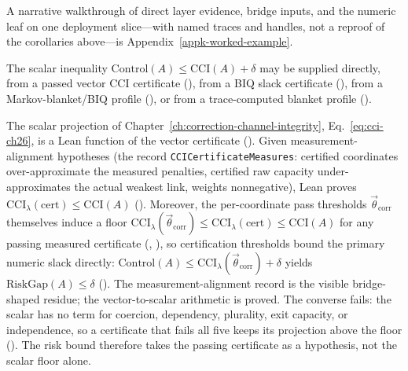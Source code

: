 A narrative walkthrough of direct layer evidence, bridge inputs, and the numeric leaf on one deployment slice---with named traces and handles, not a reproof of the corollaries above---is Appendix~\ref{appk-worked-example}.

\begin{corollary}
\label{appi:cor:numeric-risk-leaves}
The scalar inequality \(\mathrm{Control}(A)\leq \mathrm{CCI}(A)+\delta\) may be supplied directly, from a passed vector CCI certificate (), from a BIQ slack certificate (), from a Markov-blanket/BIQ profile (), or from a trace-computed blanket profile ().
\end{corollary}

\begin{lemma}
\label{appi:lem:cci-lambda-floor}
The scalar projection of Chapter~\ref{ch:correction-channel-integrity}, Eq.~\eqref{eq:cci-ch26}, is a Lean function of the vector certificate ().
Given measurement-alignment hypotheses (the record \texttt{CCICertificateMeasures}: certified coordinates over-approximate the measured penalties, certified raw capacity under-approximates the actual weakest link, weights nonnegative), Lean proves
\(\mathrm{CCI}_{\lambda}(\mathrm{cert}) \leq \mathrm{CCI}(A)\)
().
Moreover, the per-coordinate pass thresholds \(\vec{\theta}_{\mathrm{corr}}\) themselves induce a floor
\(\mathrm{CCI}_{\lambda}(\vec{\theta}_{\mathrm{corr}}) \leq \mathrm{CCI}_{\lambda}(\mathrm{cert}) \leq \mathrm{CCI}(A)\)
for any passing measured certificate (, ), so certification thresholds bound the primary numeric slack directly:
\(\mathrm{Control}(A)\leq \mathrm{CCI}_{\lambda}(\vec{\theta}_{\mathrm{corr}})+\delta\) yields \(\mathrm{RiskGap}(A)\leq\delta\)
().
The measurement-alignment record is the visible bridge-shaped residue; the vector-to-scalar arithmetic is proved.
The converse fails: the scalar has no term for coercion, dependency, plurality, exit capacity, or independence, so a certificate that fails all five keeps its projection above the floor (). The risk bound therefore takes the passing certificate as a hypothesis, not the scalar floor alone.
\end{lemma}

